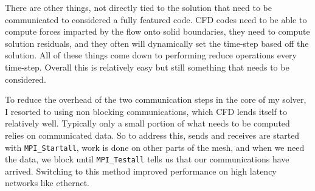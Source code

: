\documentclass[12pt,parskip=full]{article}
\numberwithin{subsection}{section}
\begin{document}
		\begin{figure}[H]
			\centering
			\begin{subfigure}[H]{0.6\textwidth}
			\end{subfigure}
			\begin{subfigure}[H]{0.6\textwidth}
			\end{subfigure}
		\end{figure}
		There are other things, not directly tied to the solution that need to be communicated to considered a fully featured code.
		CFD codes need to be able to compute forces imparted by the flow onto solid boundaries, they need to compute solution residuals,
		and they often will dynamically set the time-step based off the solution. All of these things come down to performing reduce
		operations every time-step. Overall this is relatively easy but still something that needs to be considered.

		To reduce the overhead of the two communication steps in the core of my solver, I resorted to using non blocking communications,
		which CFD lends itself to relatively well. Typically only a small portion of what needs to be computed relies on communicated data.
		So to address this, sends and receives are started with \verb|MPI_Startall|, work is done on other parts of the mesh, and when we
		need the data, we block until \verb|MPI_Testall| tells us that our communications have arrived. Switching to this method improved
		performance on high latency networks like ethernet.
\end{document}
